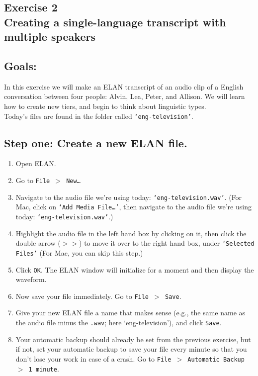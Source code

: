 \documentclass[letterpaper,12pt]{article}
\begin{document}
\begin{center}
\section*{Exercise 2\\Creating a single-language transcript with multiple speakers}
\end{center}

\subsection*{Goals:}
\noindent In this exercise we will make an ELAN transcript of an audio clip of a English conversation between four people: Alvin, Lea, Peter, and Allison. We will learn how to create new tiers, and begin to think about linguistic types.\\

\noindent Today's files are found in the folder called \texttt{`eng-television'}.
\subsection*{Step one: Create a new ELAN file.}

\begin{enumerate}
\item Open ELAN.
\item Go to \texttt{File $>$ New\ldots}
\item Navigate to the audio file we're using today: \texttt{`eng-television.wav'}. (For Mac, click on \texttt{`Add Media File\ldots'}, then navigate to the audio file we're using today: \texttt{`eng-television.wav'}.)
\item Highlight the audio file in the left hand box by clicking on it, then click the double arrow ($>>$) to move it over to the right hand box, under \texttt{`Selected Files'} (For Mac, you can skip this step.)
\item Click \texttt{OK}. The ELAN window will initialize for a moment and then display the waveform.
\item Now save your file immediately. Go to \texttt{File $>$ Save}.
\item Give your new ELAN file a name that makes sense (e.g., the same name as the audio file minus the \texttt{.wav}; here `eng-television'), and click \texttt{Save}.
\item Your automatic backup should already be set from the previous exercise, but if not, set your automatic backup to save your file every minute so that you don't lose your work in case of a crash. Go to \texttt{File $>$ Automatic Backup $>$ 1 minute}.
\end{enumerate}
\end{document}
